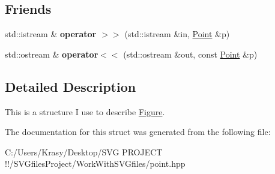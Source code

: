 \subsection*{Friends}
\begin{DoxyCompactItemize}
\item 
\mbox{\label{struct_point_a29cda78e51c1d87065c032c7fcbb7e0f}} 
std\+::istream \& {\bfseries operator $>$$>$} (std\+::istream \&in, \mbox{\hyperlink{struct_point}{Point}} \&p)
\item 
\mbox{\label{struct_point_aa818efa680e0d94ce91173ccb4b7aa08}} 
std\+::ostream \& {\bfseries operator$<$$<$} (std\+::ostream \&out, const \mbox{\hyperlink{struct_point}{Point}} \&p)
\end{DoxyCompactItemize}


\subsection{Detailed Description}
This is a structure I use to describe \mbox{\hyperlink{class_figure}{Figure}}. 

The documentation for this struct was generated from the following file\+:\begin{DoxyCompactItemize}
\item 
C\+:/\+Users/\+Krasy/\+Desktop/\+S\+V\+G P\+R\+O\+J\+E\+C\+T !!/\+S\+V\+Gfiles\+Project/\+Work\+With\+S\+V\+Gfiles/point.\+hpp\end{DoxyCompactItemize}
